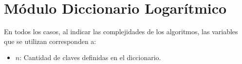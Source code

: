 \newcommand{\diccLogKS}{diccLog(\ensuremath{\kappa}, \ensuremath{\sigma})} %

\section{M\'odulo Diccionario Logar\'itmico}

  En todos los casos, al indicar las complejidades de los algoritmos, las variables que se utilizan corresponden a:
  \vspace{-0.5em}\begin{itemize}
    \item $n$: Cantidad de claves definidas en el diccionario.
  \end{itemize}



